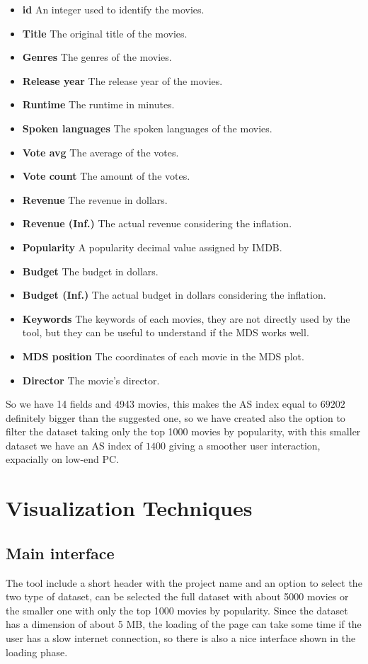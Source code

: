 \documentclass[]{article}
\begin{document}
\begin{itemize}
	\item \textbf{id} An integer used to identify the movies.
	\item \textbf{Title} The original title of the movies.
	\item \textbf{Genres} The genres of the movies.
	\item \textbf{Release year} The release year of the movies.
	\item \textbf{Runtime} The runtime in minutes.
	\item \textbf{Spoken languages} The spoken languages of the movies.
	\item \textbf{Vote avg} The average of the votes.
	\item \textbf{Vote count} The amount of the votes.
	\item \textbf{Revenue} The revenue in dollars.
	\item \textbf{Revenue (Inf.)} The actual revenue considering the inflation.
	\item \textbf{Popularity} A popularity decimal value assigned by IMDB.
	\item \textbf{Budget} The budget in dollars.
	\item \textbf{Budget (Inf.)} The actual budget in dollars considering the inflation.
	\item \textbf{Keywords}	The keywords of each movies, they are not directly used by the tool, but they can be useful to understand if the MDS works well.
	\item \textbf{MDS position} The coordinates of each movie in the MDS plot.
	\item \textbf{Director} The movie's director.
\end{itemize}
So we have 14 fields and 4943 movies, this makes the AS index equal to $69202$ definitely bigger than the suggested one, so we have created also the option to filter the dataset taking only the top 1000 movies by popularity, with this smaller dataset we have an AS index of $1400$ giving a smoother user interaction, expacially on low-end PC.\newline
\section{Visualization Techniques}
\subsection{Main interface}
The tool include a short header with the project name and an option to select the two type of dataset, can be selected the full dataset with about 5000 movies or the smaller one with only the top 1000 movies by popularity.\newline
Since the dataset has a dimension of about 5 MB, the loading of the page can take some time if the user has a slow internet connection, so there is also a nice interface shown in the loading phase.
\end{document}
